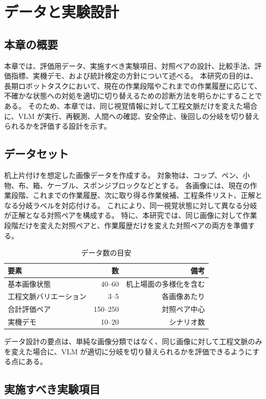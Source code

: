 \chapter{データと実験設計}

\section{本章の概要}

本章では、評価用データ、実施すべき実験項目、対照ペアの設計、比較手法、評価指標、実機デモ、および統計検定の方針について述べる。
本研究の目的は、長期ロボットタスクにおいて、現在の作業段階やこれまでの作業履歴に応じて、不確かな状態への対処を適切に切り替えるための診断方法を明らかにすることである。
そのため、本章では、同じ視覚情報に対して工程文脈だけを変えた場合に、VLM が実行、再観測、人間への確認、安全停止、後回しの分岐を切り替えられるかを評価する設計を示す。

\section{データセット}

机上片付けを想定した画像データを作成する。
対象物は、コップ、ペン、小物、布、箱、ケーブル、スポンジブロックなどとする。
各画像には、現在の作業段階、これまでの作業履歴、次に取り得る作業候補、工程条件リスト、正解となる分岐ラベルを対応付ける。
これにより、同一視覚状態に対して異なる分岐が正解となる対照ペアを構成する。
特に、本研究では、同じ画像に対して作業段階だけを変えた対照ペアと、作業履歴だけを変えた対照ペアの両方を準備する。

\begin{table}[tbp]
\centering
\caption{データ数の目安}
\label{tab:dataset}
\begin{tabular}{lrr}
\toprule
要素 & 数 & 備考 \\
\midrule
基本画像状態 & 40--60 & 机上場面の多様化を含む \\
工程文脈バリエーション & 3--5 & 各画像あたり \\
合計評価ペア & 150--250 & 対照ペア中心 \\
実機デモ & 10--20 & シナリオ数 \\
\bottomrule
\end{tabular}
\end{table}

データ設計の要点は、単純な画像分類ではなく、同じ画像に対して工程文脈のみを変えた場合に、VLM が適切に分岐を切り替えられるかを評価できるようにする点にある。

\section{実施すべき実験項目}

